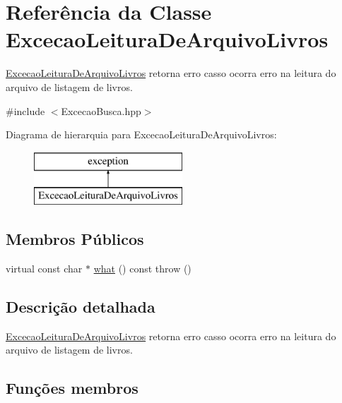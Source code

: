 \hypertarget{class_excecao_leitura_de_arquivo_livros}{}\section{Referência da Classe Excecao\+Leitura\+De\+Arquivo\+Livros}
\label{class_excecao_leitura_de_arquivo_livros}


\mbox{\hyperlink{class_excecao_leitura_de_arquivo_livros}{Excecao\+Leitura\+De\+Arquivo\+Livros}} retorna erro casso ocorra erro na leitura do arquivo de listagem de livros.  




{\ttfamily \#include $<$Excecao\+Busca.\+hpp$>$}

Diagrama de hierarquia para Excecao\+Leitura\+De\+Arquivo\+Livros\+:\begin{figure}[H]
\begin{center}
\leavevmode
\includegraphics[height=2.000000cm]{class_excecao_leitura_de_arquivo_livros}
\end{center}
\end{figure}
\subsection*{Membros Públicos}
\begin{DoxyCompactItemize}
\item 
virtual const char $\ast$ \mbox{\hyperlink{class_excecao_leitura_de_arquivo_livros_a6238ba03419f6773ae91c0a4696cd0b3}{what}} () const  throw ()
\end{DoxyCompactItemize}


\subsection{Descrição detalhada}
\mbox{\hyperlink{class_excecao_leitura_de_arquivo_livros}{Excecao\+Leitura\+De\+Arquivo\+Livros}} retorna erro casso ocorra erro na leitura do arquivo de listagem de livros. 

\subsection{Funções membros}
\mbox{\label{class_excecao_leitura_de_arquivo_livros_a6238ba03419f6773ae91c0a4696cd0b3}} 
